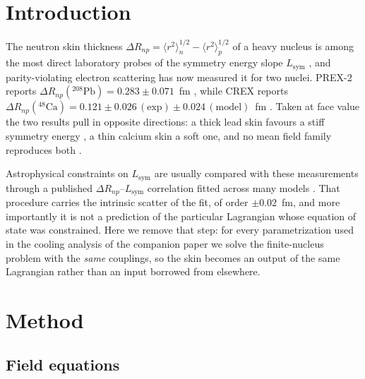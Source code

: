 \documentclass[aps,prc,twocolumn,showpacs,superscriptaddress,floatfix]{revtex4-2}
\newcommand{\Lsym}{L_{\mathrm{sym}}}
\newcommand{\DRnp}{\Delta R_{np}}
\begin{document}

\maketitle

\section{Introduction}

The neutron skin thickness
$\DRnp = \langle r^2\rangle_n^{1/2} - \langle r^2\rangle_p^{1/2}$
of a heavy nucleus is among the most direct laboratory probes of the symmetry
energy slope $\Lsym$ \cite{Brown2000,Furnstahl2002,RocaMaza2011}, and
parity-violating electron scattering \cite{HorowitzPiekarewicz2001} has now
measured it for two nuclei. PREX-2 reports
$\DRnp(^{208}\mathrm{Pb}) = 0.283\pm0.071$~fm \cite{PREX2}, while CREX reports
$\DRnp(^{48}\mathrm{Ca}) = 0.121\pm0.026\,(\mathrm{exp})\pm0.024\,(\mathrm{model})$~fm
\cite{CREX}.
Taken at face value the two results pull in opposite directions: a thick lead
skin favours a stiff symmetry energy \cite{Reed2021}, a thin calcium skin a
soft one, and no mean field family reproduces both \cite{Reinhard2022}.

Astrophysical constraints on $\Lsym$ are usually compared with these
measurements through a published $\DRnp$--$\Lsym$ correlation fitted across many
models \cite{RocaMaza2011}. That procedure carries the intrinsic scatter of the
fit, of order $\pm0.02$~fm, and more importantly it is not a prediction of the
particular Lagrangian whose equation of state was constrained. Here we remove
that step: for every parametrization used in the cooling analysis of the
companion paper \cite{PaperI} we solve the finite-nucleus problem with the
\emph{same} couplings, so the skin becomes an output of the same Lagrangian
rather than an input borrowed from elsewhere.

\section{Method}

\subsection{Field equations}
\end{document}
